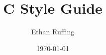 
\title{C Style Guide}
\date{\today}
\author{Ethan Ruffing}

\def\copyrightpage{
	\clearpage\null
	\vspace*{.15\textheight}
	\pagestyle{empty}
	\begin{minipage}[t!]{0.9\textwidth}
		Copyright \copyright 2014--\the\year\ by Ethan Ruffing.\par
		
		\begin{figure}[H]
			\texttt{[image: by-nc-nd.eps]}
		\end{figure}
		
		This work is licensed under the Creative Commons
		Attribution-NonCommercial-NoDerivatives 4.0 International License. To
		view a copy of this license, visit
		\url{http://creativecommons.org/licenses/by-nc-nd/4.0/}.
	\end{minipage}
	\vspace*{4\baselineskip}
	\cleardoublepage
}
